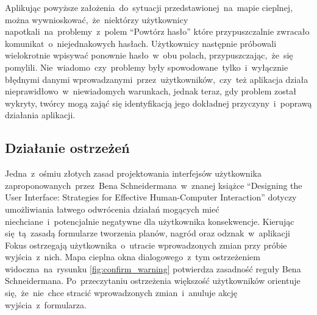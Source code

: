 \bigskip
{}

Aplikując powyższe założenia~do~sytuacji przedstawionej~na~mapie cieplnej, można wywnioskować,~że~niektórzy użytkownicy napotkali~na~problemy~z~polem ``Powtórz hasło'' które przypuszczalnie zwracało komunikat~o~niejednakowych hasłach. Użytkownicy następnie próbowali wielokrotnie wpisywać ponownie hasło~w~obu polach, przypuszczając,~że~się pomylili. Nie~wiadomo~czy~problemy były spowodowane~tylko~i~wyłącznie błędnymi danymi wprowadzanymi~przez~użytkowników,~czy~też aplikacja działa nieprawidłowo~w~niewiadomych warunkach, jednak teraz, gdy problem został wykryty, twórcy mogą zająć się identyfikacją jego dokładnej przyczyny~i~poprawą działania aplikacji.

\subsection{Działanie ostrzeżeń}
Jedna~z~ośmiu złotych zasad projektowania interfejsów użytkownika zaproponowanych~przez~Bena Schneidermana~w~znanej książce ``Designing the User Interface: Strategies for Effective Human-Computer Interaction'' \cite{Designing_IU} dotyczy umożliwiania łatwego odwrócenia działań mogących mieć niechciane~i~potencjalnie negatywne dla użytkownika konsekwencje. Kierując się~tą~zasadą formularze tworzenia planów, nagród oraz odznak~w~aplikacji Fokus ostrzegają użytkownika~o~utracie wprowadzonych zmian przy próbie wyjścia~z~nich. Mapa cieplna okna dialogowego~z~tym ostrzeżeniem widoczna~na~rysunku \ref{fig:confirm_warning} potwierdza zasadność reguły Bena Schneidermana. Po~przeczytaniu ostrzeżenia większość użytkowników orientuje się,~że~nie~chce stracić wprowadzonych zmian~i~anuluje akcję wyjścia~z~formularza.

\bigskip
{}
